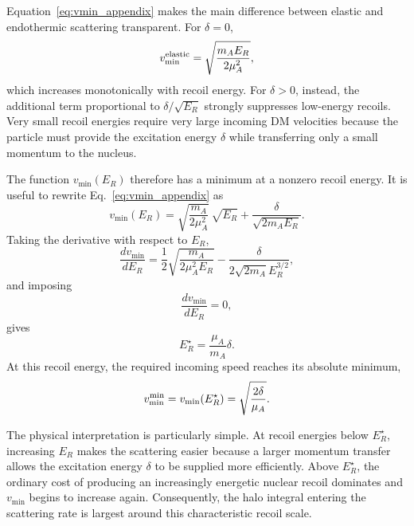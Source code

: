 \documentclass[aps,prd,reprint,superscriptaddress,nofootinbib,longbibliography,floatfix]{revtex4-2}
\begin{document}
Equation~\eqref{eq:vmin_appendix} makes the main difference between elastic and endothermic scattering transparent. For $\delta=0$,
\begin{equation}
v_{\min}^{\rm elastic}
=
\sqrt{\frac{m_AE_R}{2\mu_A^2}},
\end{equation}
which increases monotonically with recoil energy. For $\delta>0$, instead, the additional term proportional to $\delta/\sqrt{E_R}$ strongly suppresses low-energy recoils. Very small recoil energies require very large incoming DM velocities because the particle must provide the excitation energy $\delta$ while transferring only a small momentum to the nucleus.

The function $v_{\min}(E_R)$ therefore has a minimum at a nonzero recoil energy. It is useful to rewrite Eq.~\eqref{eq:vmin_appendix} as
\begin{equation}
v_{\min}(E_R)
=
\sqrt{\frac{m_A}{2\mu_A^2}}\,\sqrt{E_R}
+
\frac{\delta}{\sqrt{2m_AE_R}}.
\end{equation}
Taking the derivative with respect to $E_R$,
\begin{equation}
\frac{d v_{\min}}{dE_R}
=
\frac{1}{2}
\sqrt{\frac{m_A}{2\mu_A^2E_R}}
-
\frac{\delta}
{2\sqrt{2m_A}E_R^{3/2}},
\end{equation}
and imposing
\begin{equation}
\frac{d v_{\min}}{dE_R}=0,
\end{equation}
gives
\begin{equation}
E_R^\star
=
\frac{\mu_A}{m_A}\delta.
\label{eq:estar_appendix}
\end{equation}
At this recoil energy, the required incoming speed reaches its absolute minimum,
\begin{equation}
v_{\min}^{\rm min}
=
v_{\min}(E_R^\star)
=
\sqrt{\frac{2\delta}{\mu_A}}.
\label{eq:vminminimum}
\end{equation}

The physical interpretation is particularly simple. At recoil energies below $E_R^\star$, increasing $E_R$ makes the scattering easier because a larger momentum transfer allows the excitation energy $\delta$ to be supplied more efficiently. Above $E_R^\star$, the ordinary cost of producing an increasingly energetic nuclear recoil dominates and $v_{\min}$ begins to increase again. Consequently, the halo integral entering the scattering rate is largest around this characteristic recoil scale.
\end{document}
